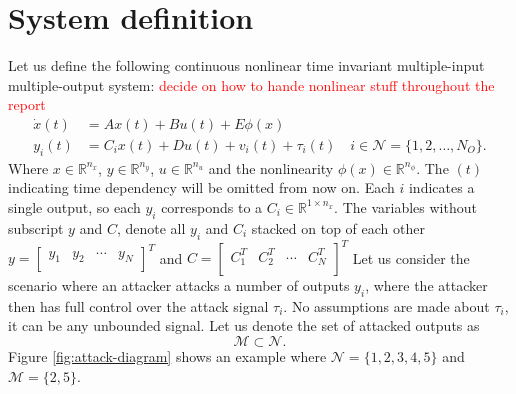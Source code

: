 \section{System definition}\label{ch:system-definition}
Let us define the following continuous nonlinear time invariant multiple-input multiple-output system: \textcolor{red}{decide on how to hande nonlinear stuff throughout the report}
\begin{equation}\label{eqn:standard-system}
    \begin{split}
        \dot{x}(t) &= Ax(t) + Bu(t) + E\phi(x) \\
        y_i(t) &= C_ix(t) + Du(t) + v_i(t) + \tau_i(t) \quad i \in \mathcal{N} = \{1,2,\dots,N_O\}.
    \end{split}
\end{equation}
Where $x \in \mathbb{R}^{n_x}$, $y \in \mathbb{R}^{n_y}$, $u \in \mathbb{R}^{n_u}$ and the nonlinearity $\phi(x) \in \mathbb{R}^{n_{\phi}}$. The $(t)$ indicating time dependency will be omitted from now on. Each $i$ indicates a single output, so each $y_i$ corresponds to a $C_i \in \mathbb{R}^{1 \times n_x}$. The variables without subscript $y$ and $C$, denote all $y_i$ and $C_i$ stacked on top of each other 
$y = 
\begin{bmatrix}
    y_1 & y_2 & \cdots & y_{N} \\
\end{bmatrix}^{T}$ and
$C =
\begin{bmatrix}
    C_1^T & C_2^T & \cdots & C_N^T \\
\end{bmatrix}^{T}$
Let us consider the scenario where an attacker attacks a number of outputs $y_i$, where the attacker then has full control over the attack signal $\tau_i$. No assumptions are made about $\tau_i$, it can be any unbounded signal. Let us denote the set of attacked outputs as 
\begin{equation}\label{eqn:M-definition}
    \mathcal{M} \subset \mathcal{N}.
\end{equation}
Figure \ref{fig:attack-diagram} shows an example where $\mathcal{N}=\{1,2,3,4,5\}$ and $\mathcal{M} = \{2,5\}$.

